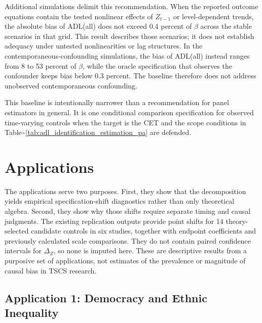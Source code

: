 \documentclass[
]{article}
\begin{document}
Additional simulations delimit this recommendation. When the reported
outcome equations contain the tested nonlinear effects of \(Z_{t-1}\) or
level-dependent trends, the absolute bias of ADL(all) does not exceed
0.4 percent of \(\beta\) across the stable scenarios in that grid. This
result describes those scenarios; it does not establish adequacy under
untested nonlinearities or lag structures. In the
contemporaneous-confounding simulations, the bias of ADL(all) instead
ranges from 8 to 53 percent of \(\beta\), while the oracle specification
that observes the confounder keeps bias below 0.3 percent. The baseline
therefore does not address unobserved contemporaneous confounding.

This baseline is intentionally narrower than a recommendation for panel
estimators in general. It is one conditional comparison specification
for observed time-varying controls when the target is the CET and the
scope conditions in
Table\textasciitilde{}\ref{tab:adl_identification_estimation_pa} are
defended.

\section{\texorpdfstring{Applications
\label{sec:applications}}{Applications }}\label{applications}

The applications serve two purposes. First, they show that the
decomposition yields empirical specification-shift diagnostics rather
than only theoretical algebra. Second, they show why those shifts
require separate timing and causal judgments. The existing replication
outputs provide point shifts for 14 theory-selected candidate controls
in six studies, together with endpoint coefficients and previously
calculated scale comparisons. They do not contain paired confidence
intervals for \(\Delta_Z\), so none is imputed here. These are
descriptive results from a purposive set of applications, not estimates
of the prevalence or magnitude of causal bias in TSCS research.

\subsection{\texorpdfstring{Application 1: Democracy and Ethnic
Inequality
\label{sec:app_leipziger_pa}}{Application 1: Democracy and Ethnic Inequality }}\label{application-1-democracy-and-ethnic-inequality}
\end{document}
